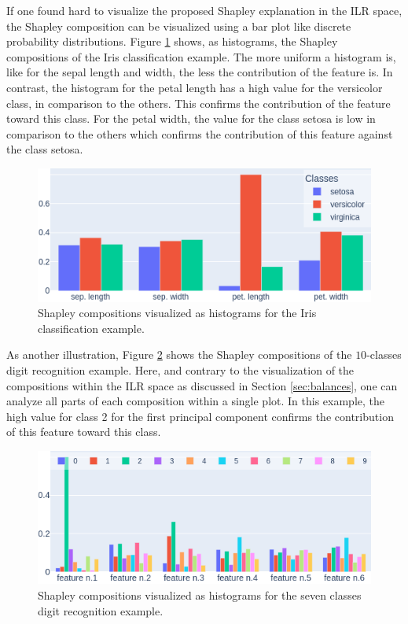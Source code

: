 \documentclass{article}
\theoremstyle{plain}
\theoremstyle{definition}
\theoremstyle{remark}
\begin{document}
If one found hard to visualize the proposed Shapley explanation in the ILR space, the Shapley composition can be visualized using a bar plot like discrete probability distributions. Figure \ref{fig:histiris} shows, as histograms, the Shapley compositions of the Iris classification example. The more uniform a histogram is, like for the sepal length and width, the less the contribution of the feature is. In contrast, the histogram for the petal length has a high value for the versicolor class, in comparison to the others. This confirms the contribution of the feature toward this class. For the petal width, the value for the class setosa is low in comparison to the others which confirms the contribution of this feature against the class setosa.
\begin{figure}
  \centering
  \includegraphics[width=0.9\linewidth]{figures/3classes/histo}
  \caption{Shapley compositions visualized as histograms for the Iris classification example.}
  \label{fig:histiris}
\end{figure}
As another illustration, Figure \ref{fig:histmore} shows the Shapley compositions of the $10$-classes digit recognition example. Here, and contrary to the visualization of the compositions within the ILR space as discussed in Section \ref{sec:balances}, one can analyze all parts of each composition within a single plot. In this example, the high value for class 2 for the first principal component confirms the contribution of this feature toward this class.
\begin{figure}
  \centering
  \includegraphics[width=0.9\linewidth]{figures/moreclasses/histo}
  \caption{Shapley compositions visualized as histograms for the seven classes digit recognition example.}
  \label{fig:histmore}
\end{figure}
\end{document}
